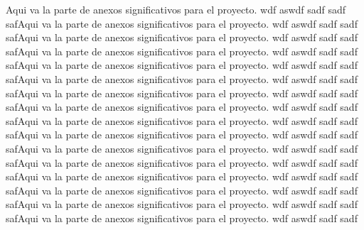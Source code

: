 Aqui va la parte de anexos significativos para el proyecto. wdf aswdf sadf sadf safAqui va la parte de anexos significativos para el proyecto. wdf aswdf sadf sadf safAqui va la parte de anexos significativos para el proyecto. wdf aswdf sadf sadf safAqui va la parte de anexos significativos para el proyecto. wdf aswdf sadf sadf safAqui va la parte de anexos significativos para el proyecto. wdf aswdf sadf sadf safAqui va la parte de anexos significativos para el proyecto. wdf aswdf sadf sadf safAqui va la parte de anexos significativos para el proyecto. wdf aswdf sadf sadf safAqui va la parte de anexos significativos para el proyecto. wdf aswdf sadf sadf safAqui va la parte de anexos significativos para el proyecto. wdf aswdf sadf sadf safAqui va la parte de anexos significativos para el proyecto. wdf aswdf sadf sadf safAqui va la parte de anexos significativos para el proyecto. wdf aswdf sadf sadf safAqui va la parte de anexos significativos para el proyecto. wdf aswdf sadf sadf safAqui va la parte de anexos significativos para el proyecto. wdf aswdf sadf sadf safAqui va la parte de anexos significativos para el proyecto. wdf aswdf sadf sadf safAqui va la parte de anexos significativos para el proyecto. wdf aswdf sadf sadf safAqui va la parte de anexos significativos para el proyecto. wdf aswdf sadf sadf 